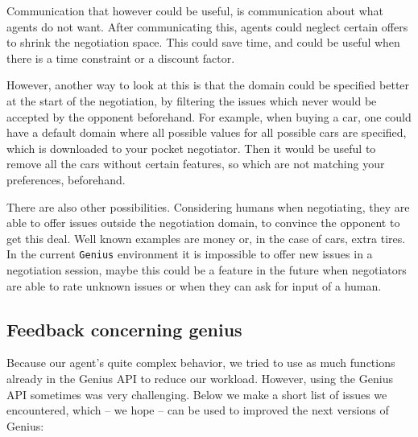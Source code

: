 Communication that however could be useful, is communication about what agents do not want. After communicating this, agents could neglect certain offers to shrink the negotiation space. This could save time, and could be useful when there is a time constraint or a discount factor. 

However, another way to look at this is that the domain could be specified better at the start of the negotiation, by filtering the issues which never would be accepted by the opponent beforehand. For example, when buying a car, one could have a default domain where all possible values for all possible cars are specified, which is 
downloaded to your pocket negotiator. Then it would be useful to remove all the cars without certain features, so which are not matching your preferences, beforehand. 

There are also other possibilities. Considering humans when negotiating, they are able to offer issues outside the negotiation domain, to convince the opponent to get this deal. Well known examples are money or, in the case of cars, extra tires. In the current \texttt{Genius} environment it is impossible to offer new issues in a negotiation session, maybe this could be a feature in the future when negotiators are able to rate unknown issues or when they can ask for input of a human. 

\subsection{Feedback concerning genius}

Because our agent's quite complex behavior, we tried to use as much functions
already in the Genius API to reduce our workload. However, using the Genius API 
sometimes was very challenging. Below we make a short list of issues we encountered,
which -- we hope -- can be used to improved the next versions of Genius:

